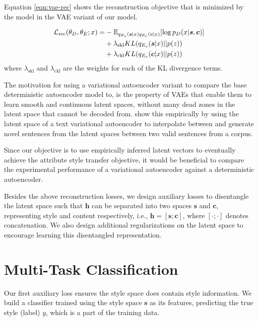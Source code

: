 Equation \ref{eqn:vae-rec} shows the reconstruction objective that is minimized by the model in the VAE variant of our model.

\begin{align} \label{eqn:vae-rec}
	\mathcal{L}_\text{rec}(\theta_D, \theta_E; x) = \nonumber
	 & - \mathbb{E}_{q_{E_s}(\bm s|x) q_{E_c}(\bm c|x)} [\log p_D(x|\bm s, \bm c)] \nonumber \\
	 & + \lambda_{\text{skl}} KL(q_{E_s}(\bm s|x)||p(z)) \nonumber                           \\
	 & + \lambda_{\text{ckl}} KL(q_{E_c}(\bm c|x)||p(z))
\end{align}
where $\lambda_{\text{skl}}$ and $\lambda_{\text{ckl}}$ are the weights for each of the KL divergence terms.

The motivation for using a variational autoencoder variant to compare the base deterministic autoencoder model to, is the property of VAEs that enable them to learn smooth and continuous latent spaces, without many dead zones in the latent space that cannot be decoded from. \cite{bowman2016generating} show this empirically by using the latent space of a text variational autoencoder to interpolate between and generate novel sentences from the latent spaces between two valid sentences from a corpus.

Since our objective is to use empirically inferred latent vectors to eventually achieve the attribute style transfer objective, it would be beneficial to compare the experimental performance of a variational autoencoder against a deterministic autoencoder.


Besides the above reconstruction losses, we design auxiliary losses to disentangle the latent space such that $\bm h$ can be separated into two spaces $\bm s$ and $\bm c$, representing style and content respectively, i.e., $\bm h = [\bm s ; \bm c]$, where $[\cdot;\cdot]$ denotes concatenation. We also design additional regularizations on the latent space to encourage learning this disentangled representation.


\section{Multi-Task Classification} \label{sec:multitask-classification-objective}

Our first auxiliary loss ensures the style space does contain style information. We build a classifier trained using the style space $\bm s$ as its features, predicting the true style (label) $y$, which is a part of the training data.

